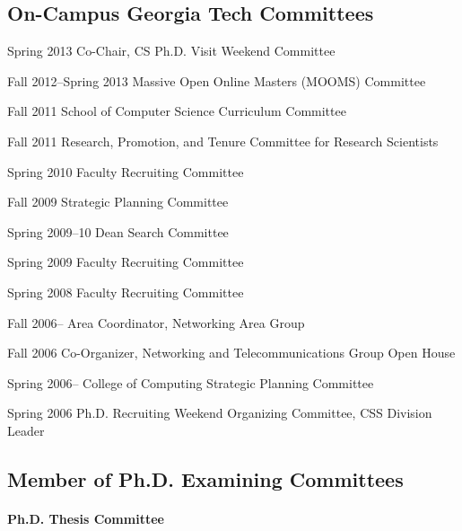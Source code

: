 

\subsection{On-Campus Georgia Tech Committees}
\label{subsec:mylabel1}

\begin{cvlist}{}
\item[Spring 2013] Co-Chair, CS Ph.D. Visit Weekend Committee
\item[Fall 2012--Spring 2013] Massive Open Online Masters (MOOMS) Committee
\item[Fall 2011] School of Computer Science Curriculum Committee
\item[Fall 2011] Research, Promotion, and Tenure Committee for Research Scientists
\item[Spring 2010] Faculty Recruiting Committee 
\item[Fall 2009] Strategic Planning Committee
\item[Spring 2009--10] Dean Search Committee
\item[Spring 2009] Faculty Recruiting Committee 
\item[Spring 2008] Faculty Recruiting Committee 
\item[Fall 2006--] Area Coordinator, Networking Area Group
\item[Fall 2006] Co-Organizer, Networking and Telecommunications Group
  Open House 
\item[Spring 2006--] College of Computing Strategic Planning
  Committee 
\item[Spring 2006] Ph.D. Recruiting Weekend Organizing Committee, CSS
  Division Leader
\end{cvlist}

\subsection{Member of Ph.D. Examining Committees}
\label{subsec:member}

\paragraph{Ph.D. Thesis Committee}

\def\phdexam#1#2#3#4{\item{{#1}, {#2}, {#3}.
\newline {\sl Principal Advisor: #4}.}}

